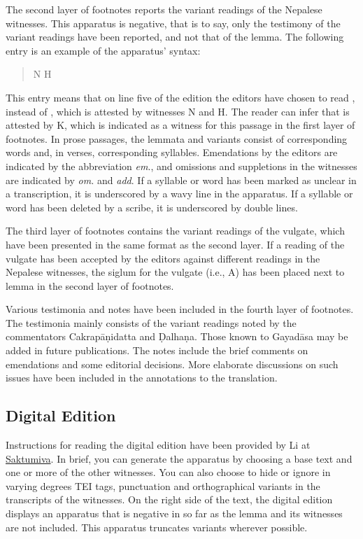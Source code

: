 The second layer of footnotes reports the variant readings of the Nepalese witnesses. This apparatus is negative, that is to say, only the testimony of the variant readings have been reported, and not that of the lemma. The following entry is an example of the apparatus' syntax:
\begin{quote}
\dev{5 pratanuṃ ]  pratanū} N H 
\end{quote}
This entry means that on line five of the edition the editors have chosen to read , instead of , which is attested by witnesses N and H. The reader can infer that  is attested by K, which is indicated as a witness for this passage in the first layer of footnotes. In prose passages, the lemmata and 
variants consist of corresponding words and, in verses, corresponding syllables. Emendations by the editors are indicated by the abbreviation \emph{em}., and omissions and suppletions in the witnesses are indicated by \emph{om.} and \emph{add}. If a syllable or word has been marked as unclear in a transcription, it is underscored by a wavy line in the apparatus. If a syllable or word has been deleted by a scribe, it is underscored by double lines. 

The third layer of footnotes contains the variant readings of the vulgate, which have been presented in the same format as the second layer. If a reading of the vulgate has been accepted by the editors against different readings in the Nepalese witnesses, the siglum for the vulgate (i.e., A) has been placed next to lemma in the second layer of footnotes. 

Various testimonia and notes have been included in the fourth layer of footnotes. The testimonia mainly consists of the variant readings noted by the commentators Cakrapāṇidatta and Ḍalhaṇa. Those known to Gayadāsa may be added in future publications. The notes include the brief comments on emendations and some editorial decisions. More elaborate discussions on such issues have been included in the annotations to the translation.

\subsection{Digital Edition}
Instructions for reading the digital edition have been provided by  Li at 
\href{https://saktumiva.org/wiki/users}{Saktumiva}. In brief, you can 
generate the apparatus by choosing a base text and one or more of the other 
witnesses. You can also choose to hide or ignore in varying degrees TEI 
tags, punctuation and orthographical variants in the transcripts of the witnesses. 
On the right side of the text, the digital edition displays an apparatus that is 
negative in so far as the lemma and its witnesses are not included. This apparatus 
truncates variants wherever possible. 

